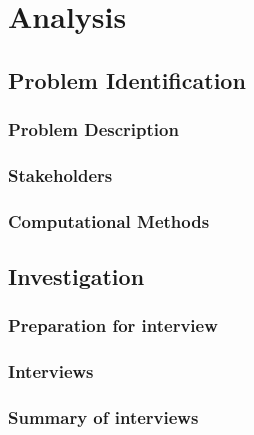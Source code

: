 \documentclass[11pt,a4paper]{report}
\title{\projectname}
\author{James Cahill}
\date{Sepetember 2023}
\begin{document}



\tableofcontents

\pagebreak

\chapter{Analysis}

\section{Problem Identification}

\subsection{Problem Description}


\subsection{Stakeholders}


\subsection{Computational Methods}


\section{Investigation}

\subsection{Preparation for interview}


\subsection{Interviews}


\begin{comment}
2 or 3

person
question
answer
brief summary
\end{comment}

\subsection{Summary of interviews}

\end{document}
